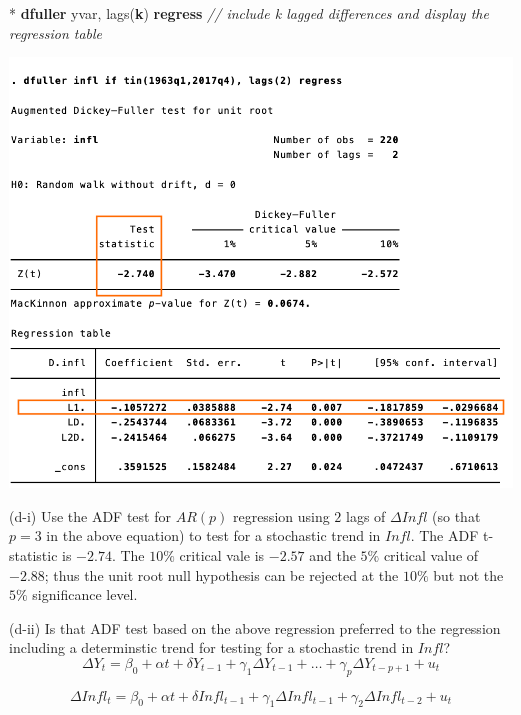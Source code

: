 \documentclass[
  10pt,
  ignorenonframetext,
]{beamer}
\newenvironment{Shaded}{\begin{snugshade}}{\end{snugshade}}
\newcommand{\CommentTok}[1]{\textcolor[rgb]{0.56,0.35,0.01}{\textit{#1}}}
\newcommand{\KeywordTok}[1]{\textcolor[rgb]{0.13,0.29,0.53}{\textbf{#1}}}
\newcommand{\NormalTok}[1]{#1}
\begin{document}
\begin{frame}[fragile]{}
\protect\hypertarget{section-1}{}
\small

\begin{Shaded}
\begin{Highlighting}[]
\NormalTok{* }\KeywordTok{dfuller}\NormalTok{ yvar, lags(}\KeywordTok{k}\NormalTok{) }\KeywordTok{regress}
\CommentTok{// include \textquotesingle{}k\textquotesingle{} lagged differences and display the regression table}
\end{Highlighting}
\end{Shaded}

\begin{flushleft}\includegraphics[width=0.7\linewidth]{pictures/(d-i)ADFtest-stochastic} \end{flushleft}
\end{frame}

\begin{frame}{(d-i) Use the ADF test for \(AR(p)\) regression using
\(2\) lags of \(\Delta Infl\) (so that \(p = 3\) in the above equation)
to test for a stochastic trend in \(Infl\).}
\protect\hypertarget{d-i-use-the-adf-test-for-arp-regression-using-2-lags-of-delta-infl-so-that-p-3-in-the-above-equation-to-test-for-a-stochastic-trend-in-infl.-1}{}
The ADF t-statistic is \(-2.74\). The \(10\%\) critical vale is
\(-2.57\) and the \(5\%\) critical value of \(-2.88\); thus the unit
root null hypothesis can be rejected at the \(10\%\) but not the \(5\%\)
significance level.
\end{frame}

\begin{frame}{(d-ii) Is that ADF test based on the above regression
preferred to the regression including a determinstic trend for testing
for a stochastic trend in \(Infl\)?}
\protect\hypertarget{d-ii-is-that-adf-test-based-on-the-above-regression-preferred-to-the-regression-including-a-determinstic-trend-for-testing-for-a-stochastic-trend-in-infl}{}
\[
\Delta Y_t = \beta_0 + \alpha t + \delta Y_{t-1} + \gamma_1\Delta Y_{t-1} + \ldots + \gamma_p \Delta Y_{t-p+1} + u_t 
\]

\[
\Delta Infl_t = \beta_0 + \alpha t + \delta Infl_{t-1} + \gamma_1\Delta Infl_{t-1} + \gamma_2\Delta Infl_{t-2} + u_t 
\]
\end{frame}
\end{document}
